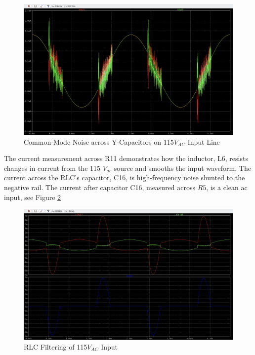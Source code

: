 \documentclass[conference]{IEEEtran}
\begin{document}
\begin{figure}[htp]
    \centering
    \includegraphics[width=1.0\linewidth]{ac_input_common_mode_y_cap_noise_waveform.png}
    \caption{Common-Mode Noise across Y-Capacitors on 115$V_{AC}$ Input Line}
    \label{fig:ac_input_common_mode_y_cap_noise_waveform}
\end{figure}

The current measurement across R11 demonstrates how the inductor, L6, resists changes in current from the 115 $V_{ac}$ source and smooths the input waveform. The current across the RLC's capacitor, C16, is high-frequency noise shunted to the negative rail. The current after capacitor C16, measured across $R5$, is a clean ac input, see Figure \ref{fig:ac_input_rlc_waveforms}

\begin{figure}[htp]
    \centering
    \includegraphics[width=1.0\linewidth]{ac_input_rlc_waveforms.png}
    \caption{RLC Filtering of 115$V_{AC}$ Input}
    \label{fig:ac_input_rlc_waveforms}
\end{figure}
\end{document}
